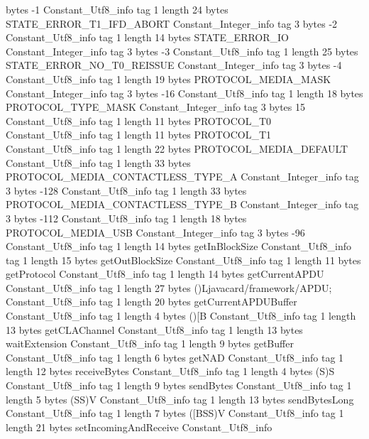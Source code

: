 {{{			bytes	-1
		}
		Constant_Utf8_info {
			tag	1
			length	24
			bytes	STATE_ERROR_T1_IFD_ABORT
		}
		Constant_Integer_info {
			tag	3
			bytes	-2
		}
		Constant_Utf8_info {
			tag	1
			length	14
			bytes	STATE_ERROR_IO
		}
		Constant_Integer_info {
			tag	3
			bytes	-3
		}
		Constant_Utf8_info {
			tag	1
			length	25
			bytes	STATE_ERROR_NO_T0_REISSUE
		}
		Constant_Integer_info {
			tag	3
			bytes	-4
		}
		Constant_Utf8_info {
			tag	1
			length	19
			bytes	PROTOCOL_MEDIA_MASK
		}
		Constant_Integer_info {
			tag	3
			bytes	-16
		}
		Constant_Utf8_info {
			tag	1
			length	18
			bytes	PROTOCOL_TYPE_MASK
		}
		Constant_Integer_info {
			tag	3
			bytes	15
		}
		Constant_Utf8_info {
			tag	1
			length	11
			bytes	PROTOCOL_T0
		}
		Constant_Utf8_info {
			tag	1
			length	11
			bytes	PROTOCOL_T1
		}
		Constant_Utf8_info {
			tag	1
			length	22
			bytes	PROTOCOL_MEDIA_DEFAULT
		}
		Constant_Utf8_info {
			tag	1
			length	33
			bytes	PROTOCOL_MEDIA_CONTACTLESS_TYPE_A
		}
		Constant_Integer_info {
			tag	3
			bytes	-128
		}
		Constant_Utf8_info {
			tag	1
			length	33
			bytes	PROTOCOL_MEDIA_CONTACTLESS_TYPE_B
		}
		Constant_Integer_info {
			tag	3
			bytes	-112
		}
		Constant_Utf8_info {
			tag	1
			length	18
			bytes	PROTOCOL_MEDIA_USB
		}
		Constant_Integer_info {
			tag	3
			bytes	-96
		}
		Constant_Utf8_info {
			tag	1
			length	14
			bytes	getInBlockSize
		}
		Constant_Utf8_info {
			tag	1
			length	15
			bytes	getOutBlockSize
		}
		Constant_Utf8_info {
			tag	1
			length	11
			bytes	getProtocol
		}
		Constant_Utf8_info {
			tag	1
			length	14
			bytes	getCurrentAPDU
		}
		Constant_Utf8_info {
			tag	1
			length	27
			bytes	()Ljavacard/framework/APDU;
		}
		Constant_Utf8_info {
			tag	1
			length	20
			bytes	getCurrentAPDUBuffer
		}
		Constant_Utf8_info {
			tag	1
			length	4
			bytes	()[B
		}
		Constant_Utf8_info {
			tag	1
			length	13
			bytes	getCLAChannel
		}
		Constant_Utf8_info {
			tag	1
			length	13
			bytes	waitExtension
		}
		Constant_Utf8_info {
			tag	1
			length	9
			bytes	getBuffer
		}
		Constant_Utf8_info {
			tag	1
			length	6
			bytes	getNAD
		}
		Constant_Utf8_info {
			tag	1
			length	12
			bytes	receiveBytes
		}
		Constant_Utf8_info {
			tag	1
			length	4
			bytes	(S)S
		}
		Constant_Utf8_info {
			tag	1
			length	9
			bytes	sendBytes
		}
		Constant_Utf8_info {
			tag	1
			length	5
			bytes	(SS)V
		}
		Constant_Utf8_info {
			tag	1
			length	13
			bytes	sendBytesLong
		}
		Constant_Utf8_info {
			tag	1
			length	7
			bytes	([BSS)V
		}
		Constant_Utf8_info {
			tag	1
			length	21
			bytes	setIncomingAndReceive
		}
		Constant_Utf8_info {
}}}
